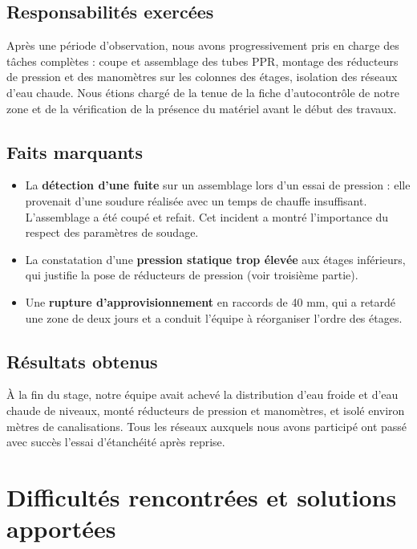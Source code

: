 \subsection{Responsabilités exercées}
Après une période d'observation, nous avons progressivement pris en charge des tâches
complètes : coupe et assemblage des tubes PPR, montage des réducteurs de pression et des
manomètres sur les colonnes des étages, isolation des réseaux d'eau chaude. Nous étions chargé
de la tenue de la fiche d'autocontrôle de notre zone et de la vérification de la présence du
matériel avant le début des travaux.

\subsection{Faits marquants}
\begin{itemize}
  \item La \textbf{détection d'une fuite} sur un assemblage lors d'un essai de pression : elle
        provenait d'une soudure réalisée avec un temps de chauffe insuffisant. L'assemblage a été
        coupé et refait. Cet incident a montré l'importance du respect des paramètres de soudage.
  \item La constatation d'une \textbf{pression statique trop élevée} aux étages inférieurs, qui
        justifie la pose de réducteurs de pression (voir troisième partie).
  \item Une \textbf{rupture d'approvisionnement} en raccords de 40 mm, qui a retardé une zone de
        deux jours et a conduit l'équipe à réorganiser l'ordre des étages.
\end{itemize}

\subsection{Résultats obtenus}
À la fin du stage, notre équipe avait achevé la distribution d'eau froide et d'eau chaude de
 niveaux, monté  réducteurs de pression et manomètres, et isolé environ
 mètres de canalisations. Tous les réseaux auxquels nous avons participé ont passé
avec succès l'essai d'étanchéité après reprise.

\section{Difficultés rencontrées et solutions apportées}

